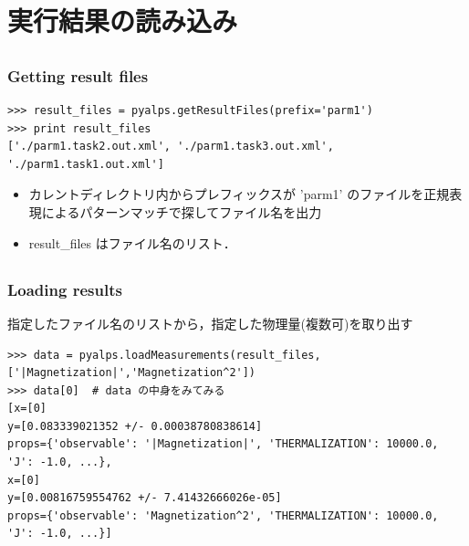 \section{実行結果の読み込み}

\subsection*{\redm\whiteb\greenb}
\begin{frame}[t,fragile]
 \frametitle{Getting result files}
\begin{lstlisting}
>>> result_files = pyalps.getResultFiles(prefix='parm1')
>>> print result_files
['./parm1.task2.out.xml', './parm1.task3.out.xml', './parm1.task1.out.xml']
\end{lstlisting}
 \begin{itemize}
  \item カレントディレクトリ内からプレフィックスが 'parm1' のファイルを正規表現によるパターンマッチで探してファイル名を出力
  \item result\_files はファイル名のリスト．
 \end{itemize}
\end{frame}

\subsection*{\redm\whiteb\greenb}
\begin{frame}[t,fragile]
\frametitle{Loading results}
指定したファイル名のリストから，指定した物理量(複数可)を取り出す
\begin{lstlisting}
>>> data = pyalps.loadMeasurements(result_files,['|Magnetization|','Magnetization^2'])
>>> data[0]  # data の中身をみてみる
[x=[0]
y=[0.083339021352 +/- 0.00038780838614]
props={'observable': '|Magnetization|', 'THERMALIZATION': 10000.0, 'J': -1.0, ...}, 
x=[0]
y=[0.00816759554762 +/- 7.41432666026e-05]
props={'observable': 'Magnetization^2', 'THERMALIZATION': 10000.0, 'J': -1.0, ...}]
\end{lstlisting}
\end{frame}


